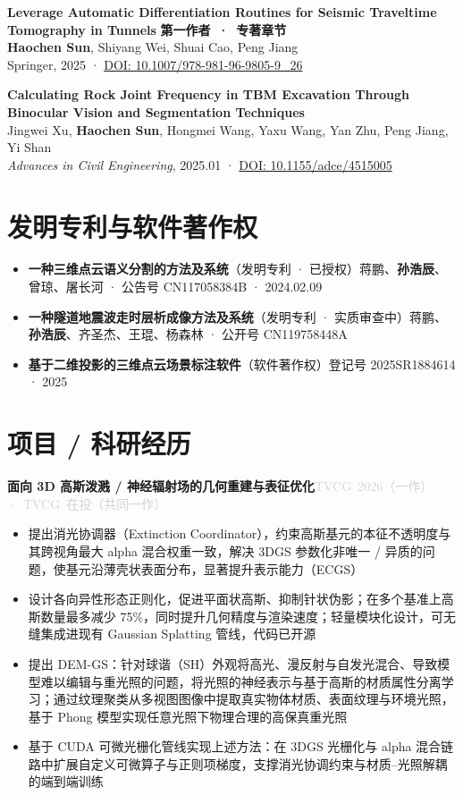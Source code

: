 \documentclass[10pt, a4paper]{ctexart}
\newcommand{\taghl}[1]{\mbox{\textcolor{accent}{\textbf{#1}}}}
\newcommand{\taggray}[1]{\mbox{\textcolor{lightgray}{#1}}}
\begin{document}
\begin{pubs}
  \item \textbf{Leverage Automatic Differentiation Routines for Seismic Traveltime Tomography in Tunnels} \taghl{第一作者 · 专著章节}\\
  \textbf{Haochen Sun}, Shiyang Wei, Shuai Cao, Peng Jiang\\
  Springer, 2025 · \href{https://doi.org/10.1007/978-981-96-9805-9_26}{DOI: 10.1007/978-981-96-9805-9\_26}

  \item \textbf{Calculating Rock Joint Frequency in TBM Excavation Through Binocular Vision and Segmentation Techniques}\\
  Jingwei Xu, \textbf{Haochen Sun}, Hongmei Wang, Yaxu Wang, Yan Zhu, Peng Jiang, Yi Shan\\
  \textit{Advances in Civil Engineering}, 2025.01 ·
  \href{https://doi.org/10.1155/adce/4515005}{DOI: 10.1155/adce/4515005}
\end{pubs}

\section{发明专利与软件著作权}
\begin{itemize}
  \item \textbf{一种三维点云语义分割的方法及系统}（发明专利 · 已授权）蒋鹏、\textbf{孙浩辰}、曾琼、屠长河 · 公告号 CN117058384B · 2024.02.09
  \item \textbf{一种隧道地震波走时层析成像方法及系统}（发明专利 · 实质审查中）蒋鹏、\textbf{孙浩辰}、齐圣杰、王琨、杨森林 · 公开号 CN119758448A
  \item \textbf{基于二维投影的三维点云场景标注软件}（软件著作权）登记号 2025SR1884614 · 2025
\end{itemize}

\section{项目 / 科研经历}

\noindent\textbf{面向 3D 高斯泼溅 / 神经辐射场的几何重建与表征优化}\hfill \taggray{TVCG 2026（一作）· TVCG 在投（共同一作）}
\begin{itemize}
  \item 提出消光协调器（Extinction Coordinator），约束高斯基元的本征不透明度与其跨视角最大 alpha 混合权重一致，解决 3DGS 参数化非唯一 / 异质的问题，使基元沿薄壳状表面分布，显著提升表示能力（ECGS）
  \item 设计各向异性形态正则化，促进平面状高斯、抑制针状伪影；在多个基准上高斯数量最多减少 75\%，同时提升几何精度与渲染速度；轻量模块化设计，可无缝集成进现有 Gaussian Splatting 管线，代码已开源
  \item 提出 DEM-GS：针对球谐（SH）外观将高光、漫反射与自发光混合、导致模型难以编辑与重光照的问题，将光照的神经表示与基于高斯的材质属性分离学习；通过纹理聚类从多视图图像中提取真实物体材质、表面纹理与环境光照，基于 Phong 模型实现任意光照下物理合理的高保真重光照
  \item 基于 CUDA 可微光栅化管线实现上述方法：在 3DGS 光栅化与 alpha 混合链路中扩展自定义可微算子与正则项梯度，支撑消光协调约束与材质–光照解耦的端到端训练
\end{itemize}
\end{document}
